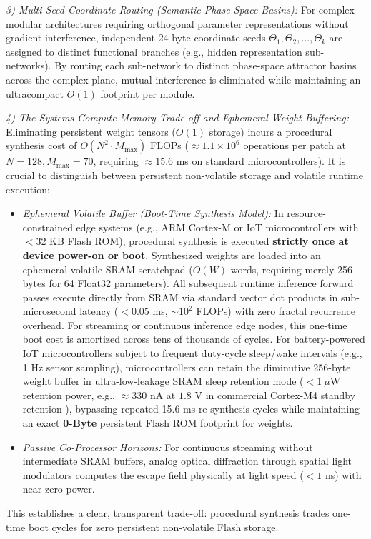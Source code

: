 \documentclass[10pt,journal,compsoc,twocolumn]{article}
\begin{document}
\textit{3) Multi-Seed Coordinate Routing (Semantic Phase-Space Basins):}
For complex modular architectures requiring orthogonal parameter representations without gradient interference, independent 24-byte coordinate seeds $\Theta_1, \Theta_2, \dots, \Theta_k$ are assigned to distinct functional branches (e.g., hidden representation sub-networks). By routing each sub-network to distinct phase-space attractor basins across the complex plane, mutual interference is eliminated while maintaining an ultracompact $O(1)$ footprint per module.

\textit{4) The Systems Compute-Memory Trade-off and Ephemeral Weight Buffering:}
Eliminating persistent weight tensors ($O(1)$ storage) incurs a procedural synthesis cost of $O(N^2 \cdot M_{\max})$ FLOPs ($\approx 1.1 \times 10^6$ operations per patch at $N=128, M_{\max}=70$, requiring $\approx 15.6$ ms on standard microcontrollers). It is crucial to distinguish between persistent non-volatile storage and volatile runtime execution:
\begin{itemize}
    \item \textit{Ephemeral Volatile Buffer (Boot-Time Synthesis Model):} In resource-constrained edge systems (e.g., ARM Cortex-M or IoT microcontrollers with $<32$ KB Flash ROM), procedural synthesis is executed \textbf{strictly once at device power-on or boot}. Synthesized weights are loaded into an ephemeral volatile SRAM scratchpad ($O(W)$ words, requiring merely 256 bytes for 64 Float32 parameters). All subsequent runtime inference forward passes execute directly from SRAM via standard vector dot products in sub-microsecond latency ($<0.05$ ms, $\sim 10^2$ FLOPs) with zero fractal recurrence overhead. For streaming or continuous inference edge nodes, this one-time boot cost is amortized across tens of thousands of cycles. For battery-powered IoT microcontrollers subject to frequent duty-cycle sleep/wake intervals (e.g., 1 Hz sensor sampling), microcontrollers can retain the diminutive 256-byte weight buffer in ultra-low-leakage SRAM sleep retention mode ($<1\ \mu\text{W}$ retention power, e.g., $\approx 330\text{ nA}$ at $1.8\text{ V}$ in commercial Cortex-M4 standby retention \cite{stmicro2021stm32l}), bypassing repeated 15.6 ms re-synthesis cycles while maintaining an exact \textbf{0-Byte} persistent Flash ROM footprint for weights.
    \item \textit{Passive Co-Processor Horizons:} For continuous streaming without intermediate SRAM buffers, analog optical diffraction through spatial light modulators computes the escape field physically at light speed ($<1$ ns) with near-zero power.
\end{itemize}
This establishes a clear, transparent trade-off: procedural synthesis trades one-time boot cycles for zero persistent non-volatile Flash storage.
\end{document}

